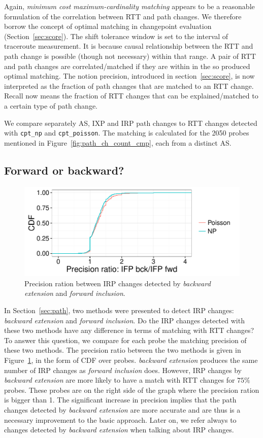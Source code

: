 Again, \textit{minimum cost maximum-cardinality matching} appears to be a reasonable formulation of the correlation between RTT and path changes.
We therefore borrow the concept of optimal matching in changepoint evaluation (Section~\ref{sec:score}).
The shift tolerance window is set to the interval of traceroute measurement.
It is because causal relationship between the RTT and path change is possible (though not necessary) within that range.
A pair of RTT and path changes are correlated/matched if they are within in the so produced optimal matching.
The notion precision, introduced in section~\ref{sec:score}, is now interpreted as the fraction of path changes that are matched to an RTT change.
Recall now means the fraction of RTT changes that can be explained/matched to a certain type of path change.

We compare separately AS, IXP and \ac{IRP} path changes to RTT changes detected with \texttt{cpt\_np} and \texttt{cpt\_poisson}.
The matching is calculated for the 2050 probes mentioned in Figure~\ref{fig:path_ch_count_cmp}, each from a distinct AS.


\subsection{Forward or backward?}
\begin{figure}[!htb]
\centering
\includegraphics[width=.72\textwidth]{gfx/chap4/ifp_bck_ch_precision_gain_cdf.pdf}
\caption{Precision ration between IRP changes detected by \textit{backward extension} and \textit{forward inclusion}.}
\label{fig:IRP_bck_ch_precision_gain_cdf}
\end{figure}

In Section~\ref{sec:path}, two methods were presented to detect \ac{IRP} changes: \textit{backward extension} and \textit{forward inclusion}.
Do the \ac{IRP} changes detected with these two methods have any difference in terms of matching with RTT changes?
To answer this question, we compare for each probe the matching precision of these two methods.
The precision ratio between the two methods is given in Figure~\ref{fig:IRP_bck_ch_precision_gain_cdf}, in the form of CDF over probes.
\textit{backward extension} produces the same number of \ac{IRP} changes as \textit{forward inclusion} does.
However, \ac{IRP} changes by \textit{backward extension} are more likely to have a match with RTT changes for $75\%$ probes.
These probes are on the right side of the graph where the precision ration is bigger than 1.	
The significant increase in precision implies that the path changes detected by \textit{backward extension} are more accurate and are thus is a necessary improvement to the basic approach.
Later on, we refer always to changes detected by \textit{backward extension} when talking about \ac{IRP} changes.

